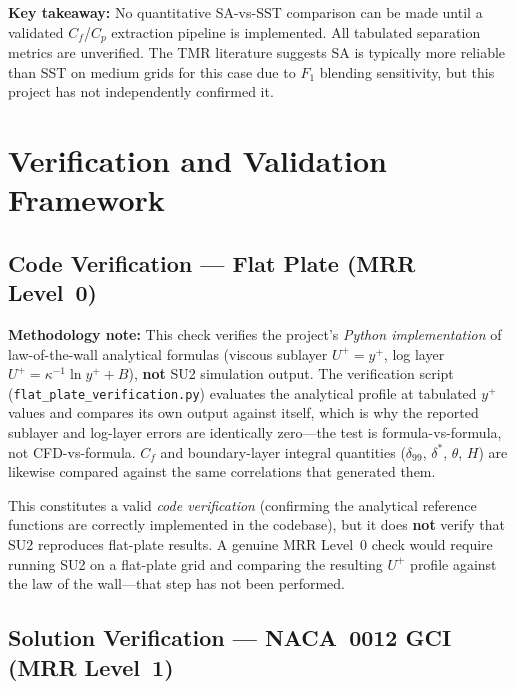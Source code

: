 \documentclass[11pt,a4paper]{article}
\begin{document}
\noindent\textbf{Key takeaway:} No quantitative SA-vs-SST comparison
can be made until a validated $C_f$/$C_p$ extraction pipeline is
implemented.  All tabulated separation metrics are unverified.
The TMR literature suggests SA is typically more reliable than SST on
medium grids for this case due to $F_1$ blending sensitivity, but this
project has not independently confirmed it.

\section{Verification and Validation Framework}
\label{sec:vv}

\subsection{Code Verification --- Flat Plate (MRR Level~0)}

\textbf{Methodology note:} This check verifies the project's
\emph{Python implementation} of law-of-the-wall analytical formulas
(viscous sublayer $U^+ = y^+$, log layer $U^+ = \kappa^{-1}\ln y^+ + B$),
\textbf{not} SU2 simulation output.  The verification script
(\texttt{flat\_plate\_verification.py}) evaluates the analytical
profile at tabulated $y^+$ values and compares its own output against
itself, which is why the reported sublayer and log-layer errors are
identically zero---the test is formula-vs-formula, not CFD-vs-formula.
$C_f$ and boundary-layer integral quantities ($\delta_{99}$, $\delta^*$,
$\theta$, $H$) are likewise compared against the same correlations that
generated them.

This constitutes a valid \emph{code verification} (confirming the
analytical reference functions are correctly implemented in the
codebase), but it does \textbf{not} verify that SU2 reproduces
flat-plate results.  A genuine MRR Level~0 check would require running
SU2 on a flat-plate grid and comparing the resulting $U^+$ profile
against the law of the wall---that step has not been performed.

\subsection{Solution Verification --- NACA~0012 GCI (MRR Level~1)}
\end{document}
